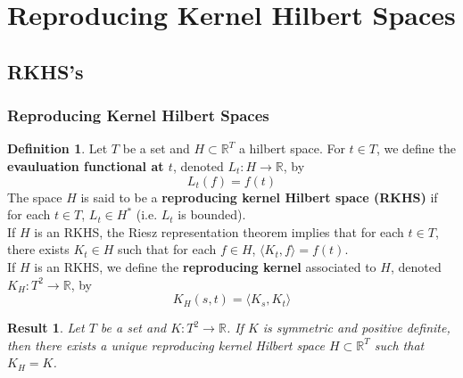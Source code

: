 \documentclass[notheorems]{beamer}
\newtheorem{res}[thm]{Result}
\theoremstyle{definition}
\newtheorem{defn}[definition]{Definition}
\theoremstyle{definition}
\newcommand{\R}{\mathbb{R}}
\renewcommand{\r}{\rangle}
\renewcommand{\l}{\langle}
\begin{document}
\section{Reproducing Kernel Hilbert Spaces}
\subsection{RKHS's}
\begin{frame}

\frametitle{Reproducing Kernel Hilbert Spaces}



\begin{defn}
Let $T$ be a set and $H \subset \R^T$ a hilbert space. For $t \in T$, we define the \textbf{evauluation functional at $t$}, denoted $L_t : H \rightarrow \R$, by $$L_t(f) = f(t)$$ 
\pause
The space $H$ is said to be a \textbf{reproducing kernel Hilbert space (RKHS)} if for each $t \in T$, $L_t \in H^*$ (i.e. $L_t$ is bounded). \\
\pause
If $H$ is an RKHS, the Riesz representation theorem implies that for each $t \in T$, there exists $K_t \in H$ such that for each $f \in H$, $\l K_t, f\r = f(t)$. \\
\pause
If $H$ is an RKHS, we define the \textbf{reproducing kernel} associated to $H$, denoted $K_H:T^2 \rightarrow \R$, by $$K_H(s,t) = \l K_s, K_t \r$$ 
\end{defn}
\end{frame}















\begin{frame}
\begin{res}
Let $T$ be a set and $K : T^2 \rightarrow \R$. If $K$ is symmetric and positive definite, then there exists a unique reproducing kernel Hilbert space $H \subset \R^T$ such that $K_H = K$.
\end{res}

\end{frame}
\end{document}
